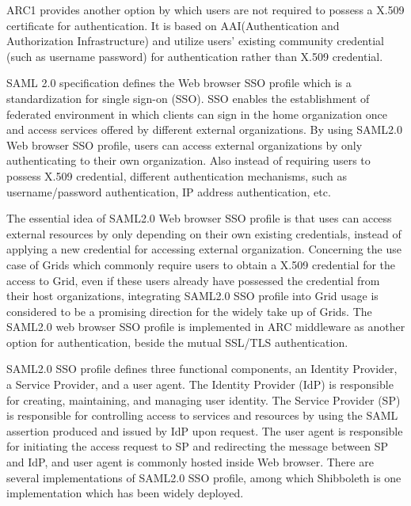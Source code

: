 \documentclass{article}                            %
\begin{document}
   ARC1 provides another option by which users are not required to possess a X.509 certificate for authentication. It is based on AAI(Authentication and Authorization Infrastructure) and utilize users' existing community credential (such as username password) for authentication rather than X.509 credential.

   SAML 2.0 specification defines the Web browser SSO profile which is a standardization for single sign-on (SSO). SSO enables the establishment of federated environment in which clients can sign in the home organization once and access services offered by different external organizations. By using SAML2.0 Web browser SSO profile, users can access external organizations by only authenticating to their own organization. Also instead of requiring users to possess X.509 credential, different authentication mechanisms, such as username/password authentication, IP address authentication, etc.

  The essential idea of SAML2.0 Web browser SSO profile is that uses can access external resources by only depending on their own existing credentials, instead of applying a new credential for accessing external organization. Concerning the use case of Grids which commonly require users to obtain a X.509 credential for the access to Grid, even if these users already have possessed the credential from their host organizations, integrating SAML2.0 SSO profile into Grid usage is considered to be a promising direction for the widely take up of Grids. The SAML2.0 web browser SSO profile is implemented in ARC middleware as another option for authentication, beside the mutual SSL/TLS authentication.

  SAML2.0 SSO profile defines three functional components, an Identity Provider, a Service Provider, and a user agent. The Identity Provider (IdP) is responsible for creating, maintaining, and managing user identity.  The Service Provider (SP) is responsible for controlling access to services and resources by using the SAML assertion produced and issued by IdP upon request. The user agent is responsible for initiating the access request to SP and redirecting the message between SP and IdP, and user agent is commonly hosted inside Web browser. There are several implementations of SAML2.0 SSO profile, among which Shibboleth is one implementation which has been widely deployed.
\end{document}
